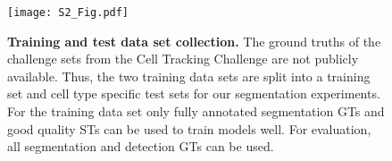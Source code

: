 \documentclass[10pt,letterpaper]{article}
\begin{document}
\cleardoublepage
\thispagestyle{empty}
\renewcommand\thefigure{S1} 
\begin{figure}[h]
\begin{adjustwidth}{-2.25in}{0in}
\centering
\texttt{[image: S2\_Fig.pdf]}
\caption{\textbf{Training and test data set collection.} The ground truths of the challenge sets from the Cell Tracking Challenge are not publicly available. Thus, the two training data sets are split into a training set and cell type specific test sets for our segmentation experiments. For the training data set only fully annotated segmentation GTs and good quality STs can be used to train models well. For evaluation, all segmentation and detection GTs can be used.}
\label{S1_Fig}
\end{adjustwidth}
\end{figure}
\cleardoublepage


\end{document}
